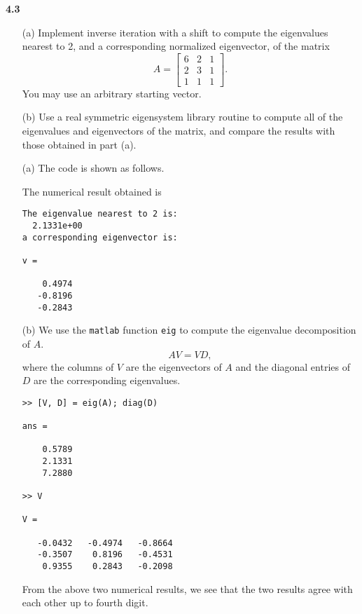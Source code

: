 \textbf{4.3}
\begin{itemize}
\item[(a)]
  Implement inverse iteration with a shift to compute the eigenvalues nearest to 2,
  and a corresponding normalized eigenvector,
  of the matrix
  \begin{displaymath}
    A =
    \begin{bmatrix}
      6 & 2 & 1
      \\
      2 & 3 & 1
      \\
      1 & 1 & 1
    \end{bmatrix}.
  \end{displaymath}
  You may use an arbitrary starting vector.

\item[(b)]
  Use a real symmetric eigensystem library routine to compute all of the eigenvalues
  and eigenvectors of the matrix,
  and compare the results with those obtained in part (a).
\end{itemize}
  \begin{multicols}{2}
    \setlength{\columnseprule}{0.2pt}
    \begin{sol}
      \begin{itemize}
        \item[(a)]
  The code is shown as follows.
  
  The numerical result obtained is
\begin{verbatim}
The eigenvalue nearest to 2 is:
  2.1331e+00
a corresponding eigenvector is:

v =

    0.4974
   -0.8196
   -0.2843
\end{verbatim}

\item[(b)]
  We use the \verb|matlab| function \verb|eig| to compute
  the eigenvalue decomposition of $A$.
  \begin{displaymath}
    AV = VD,
  \end{displaymath}
  where the columns of $V$ are the eigenvectors of $A$
  and the diagonal entries of $D$ are the corresponding eigenvalues.
\begin{verbatim}
>> [V, D] = eig(A); diag(D)

ans =

    0.5789
    2.1331
    7.2880

>> V

V =

   -0.0432   -0.4974   -0.8664
   -0.3507    0.8196   -0.4531
    0.9355    0.2843   -0.2098
\end{verbatim}
  From the above two numerical results,
  we see that the two results agree with each other up to fourth digit.
\end{itemize}
\end{sol}
\end{multicols}
